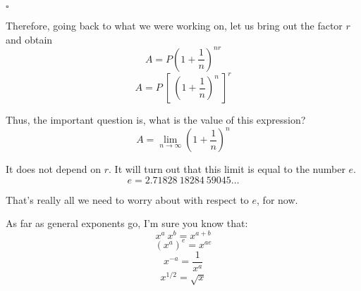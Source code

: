 \documentclass[11pt, oneside]{article}
\begin{document}
$\square$

Therefore, going back to what we were working on, let us bring out the factor $r$ and obtain
\[ A = P(1 + \frac{1}{n})^{nr} \]
\[ A = P \ [ \ (1 + \frac{1}{n})^{n} \ ] ^r \]

Thus, the important question is, what is the value of this expression?
\[ A = \lim_{n \rightarrow \infty} (1 + \frac{1}{n})^{n} \]

It does not depend on $r$.  It will turn out that this limit is equal to the number $e$.
\[ e = 2.71828\ 18284\ 59045 \dots \]

That's really all we need to worry about with respect to $e$, for now.

As far as general exponents go, I'm sure you know that:
\[ x^a \ x^b = x^{a+b} \]
\[ (x^a)^e = x^{ae} \]
\[ x^{-a} = \frac{1}{x^a} \]
\[ x^{1/2} = \sqrt{x} \]
\end{document}
